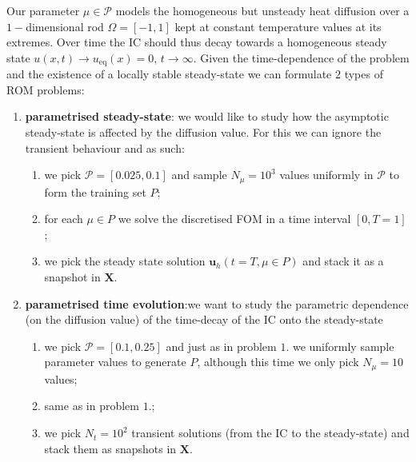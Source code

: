 \documentclass[../main.tex]{subfiles}
\begin{document}
Our parameter $\mu\in\mathcal{P}$ models the homogeneous but unsteady heat diffusion over a $1-$dimensional rod $\Omega=[-1,1]$ kept at constant temperature values at its extremes.
Over time the IC should thus decay towards a homogeneous steady state $u(x,t) \to u_{\text{eq}}(x) = 0$, $t\to\infty$. 
Given the time-dependence of the problem and the existence of a locally stable steady-state we can formulate $2$ types of ROM problems:
\begin{enumerate}
     \item \textbf{parametrised steady-state}: we would like to study how the asymptotic steady-state is affected by the diffusion value. 
             For this we can ignore the transient behaviour and as such:             \begin{enumerate}
                  \item we pick $\mathcal{P} = [0.025,0.1]$ and sample $N_{\mu}=10^{3}$ values uniformly in $\mathcal{P}$ to form the training set $P$;
                  \item for each $\mu\in P$ we solve the discretised FOM in a time interval $[0,T=1]$;
                  \item we pick the steady state solution $\boldsymbol{u}_{h}(t=T,\mu\in P)$ and stack it as a snapshot in $\boldsymbol{X}$.
             \end{enumerate}
     \item \textbf{parametrised time evolution}:we want to study the parametric dependence (on the diffusion value) of the time-decay of the IC onto the steady-state 
             \begin{enumerate}
                     \item we pick $\mathcal{P}= [0.1,0.25]$ and just as in problem $1.$ we uniformly sample parameter values to generate $P$, although this time we only pick $N_{\mu} = 10$ values;
                  \item same as in problem $1.$;
                  \item we pick $N_{t}=10^{2}$ transient solutions (from the IC to the steady-state) and stack them as snapshots in $\boldsymbol{X}$.
             \end{enumerate}
\end{enumerate}



\end{document}
